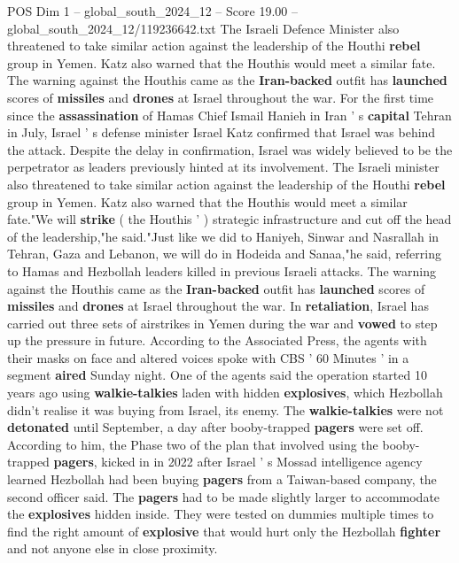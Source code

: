 \begin{textsample}{POS Dim 1 – global\_south\_2024\_12 – Score 19.00 – global\_south\_2024\_12/119236642.txt}  \label{ex:f1_pos_199}
The Israeli Defence Minister also threatened to take similar action against the leadership of the Houthi \textbf{rebel} group in Yemen.
Katz also warned that the Houthis would meet a similar fate.
The warning against the Houthis came as the \textbf{Iran-backed} outfit has \textbf{launched} scores of \textbf{missiles} and \textbf{drones} at Israel throughout the war.
For the first time since the \textbf{assassination} of Hamas Chief Ismail Hanieh in Iran ' s \textbf{capital} Tehran in July, Israel ' s defense minister Israel Katz confirmed that Israel was behind the attack.
Despite the delay in confirmation, Israel was widely believed to be the perpetrator as leaders previously hinted at its involvement.
The Israeli minister also threatened to take similar action against the leadership of the Houthi \textbf{rebel} group in Yemen.
Katz also warned that the Houthis would meet a similar fate."We will \textbf{strike} ( the Houthis ' ) strategic infrastructure and cut off the head of the leadership,"he said."Just like we did to Haniyeh, Sinwar and Nasrallah in Tehran, Gaza and Lebanon, we will do in Hodeida and Sanaa,"he said, referring to Hamas and Hezbollah leaders killed in previous Israeli attacks.
The warning against the Houthis came as the \textbf{Iran-backed} outfit has \textbf{launched} scores of \textbf{missiles} and \textbf{drones} at Israel throughout the war.
In \textbf{retaliation}, Israel has carried out three sets of airstrikes in Yemen during the war and \textbf{vowed} to step up the pressure in future.
According to the Associated Press, the agents with their masks on face and altered voices spoke with CBS ' 60 Minutes ' in a segment \textbf{aired} Sunday night.
One of the agents said the operation started 10 years ago using \textbf{walkie-talkies} laden with hidden \textbf{explosives}, which Hezbollah didn't realise it was buying from Israel, its enemy.
The \textbf{walkie-talkies} were not \textbf{detonated} until September, a day after booby-trapped \textbf{pagers} were set off.
According to him, the Phase two of the plan that involved using the booby-trapped \textbf{pagers}, kicked in in 2022 after Israel ' s Mossad intelligence agency learned Hezbollah had been buying \textbf{pagers} from a Taiwan-based company, the second officer said.
The \textbf{pagers} had to be made slightly larger to accommodate the \textbf{explosives} hidden inside.
They were tested on dummies multiple times to find the right amount of \textbf{explosive} that would hurt only the Hezbollah \textbf{fighter} and not anyone else in close proximity.

\end{textsample}
